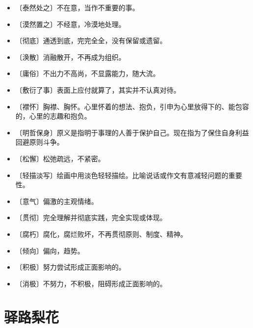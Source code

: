 \documentclass[12pt,UTF-8,openany]{ctexbook}
\begin{document}
\begin{itemize}
    \setlength\itemsep{-0.2em}
    \item 〔泰然处之〕不在意，当作不重要的事。
    \item 〔漠然置之〕不经意，冷漠地处理。
    \item 〔彻底〕通透到底，完完全全，没有保留或遗留。
    \item 〔涣散〕消融散开，不再成为组织。
    \item 〔庸俗〕不出力不高尚，不显露能力，随大流。
    \item 〔敷衍了事〕表面上应付就算了，其实并不认真对待。
    \item 〔襟怀〕胸襟、胸怀。心里怀着的想法、抱负，引申为心里放得下的、能包容的，心里的志趣和抱负。
    \item 〔明哲保身〕原义是指明于事理的人善于保护自己。现在指为了保住自身利益回避原则斗争。
    \item 〔松懈〕松弛疏远，不紧密。
    \item 〔轻描淡写〕绘画中用淡色轻轻描绘。比喻说话或作文有意减轻问题的重要性。
    \item 〔意气〕偏激的主观情绪。
    \item 〔贯彻〕完全理解并彻底实践，完全实现或体现。
    \item 〔腐朽〕腐化，腐烂败坏，不再贯彻原则、制度、精神。
    \item 〔倾向〕偏向，趋势。
    \item 〔积极〕努力尝试形成正面影响的。
    \item 〔消极〕不努力，不积极，阻碍形成正面影响的。
\end{itemize}

\chapter{驿路梨花}
\end{document}

